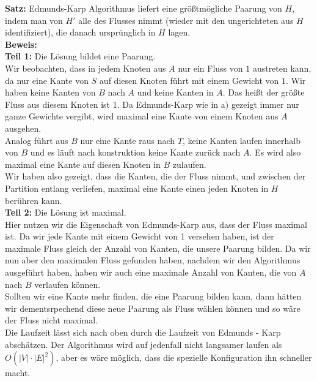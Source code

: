 \documentclass[11pt,a4paper,ngerman]{article}
\begin{document}
\begin{enumerate}[\bfseries a)]
\textbf{Satz:} Edmunds-Karp Algorithmus liefert eine größtmögliche Paarung von $H$, indem man von $H'$ alle des Flusses nimmt (wieder mit den ungerichteten aus $H$ identifiziert), die danach ursprünglich in $H$ lagen.\\

\textbf{Beweis:}\\
 \textbf{Teil 1:} Die Lösung bildet eine Paarung.\\

Wir beobachten, dass in jedem Knoten aus $A$ nur ein Fluss von $1$ austreten kann, da nur eine Kante von $S$ auf diesen Knoten führt mit einem Gewicht von $1$. Wir haben keine Kanten von $B$ nach $A$ und keine Kanten in $A$. Das heißt der größte Fluss aus diesem Knoten ist 1. Da Edmunds-Karp wie in a) gezeigt immer nur ganze Gewichte vergibt, wird maximal eine Kante von einem Knoten aus $A$ ausgehen.\\
Analog führt aus $B$ nur eine Kante raus nach $T$, keine Kanten laufen innerhalb von $B$ und es läuft nach konstruktion keine Kante zurück nach $A$. Es wird also maximal eine Kante auf diesen Knoten in $B$ zulaufen.\\

Wir haben also gezeigt, dass die Kanten, die der Fluss nimmt, und zwischen der Partition entlang verliefen, maximal eine Kante einen jeden Knoten in $H$ berühren kann.\\

\textbf{Teil 2:} Die Lösung ist maximal.\\

Hier nutzen wir die Eigenschaft von Edmunds-Karp aus, dass der Fluss maximal ist. Da wir jede Kante mit einem Gewicht von 1 versehen haben, ist der maximale Fluss gleich der Anzahl von Kanten, die unsere Paarung bilden. Da wir nun aber den maximalen Fluss gefunden haben, nachdem wir den Algorithmus ausgeführt haben, haben wir auch eine maximale Anzahl von Kanten, die von $A$ nach $B$ verlaufen können.\\

Sollten wir eine Kante mehr finden, die eine Paarung bilden kann, dann hätten wir dementsrpechend diese neue Paarung als Fluss wählen können und so wäre der Fluss nicht maximal.\\

Die Laufzeit lässt sich nach oben durch die Laufzeit von Edmunds - Karp abschätzen. Der Algorithmus wird auf jedenfall nicht langsamer laufen als $O( |V| \cdot |E|^2 )$, aber es wäre möglich, dass die spezielle Konfiguration ihn schneller macht.


\end{enumerate}
\end{document}
